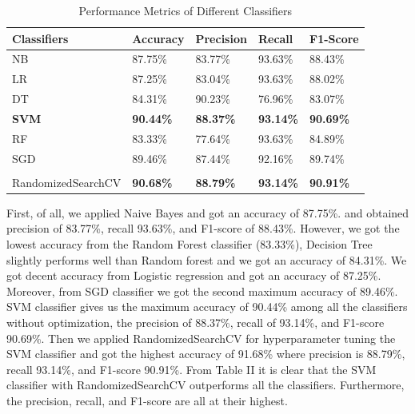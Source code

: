 \documentclass[conference]{IEEEtran}
\begin{document}
\begin{table}[h]
\caption{Performance Metrics of Different Classifiers}
\setlength{\tabcolsep}{5pt} %
\renewcommand{\arraystretch}{2.5} %
\begin{tabular}{|l|l|l|l|l|}
\hline
{\textbf{Classifiers}} & \textbf{Accuracy} & \textbf{Precision} & \textbf{Recall} & \textbf{F1-Score} \\ \hline
NB & 87.75\% & 83.77\% & 93.63\% & 88.43\% \\ \hline
LR & 87.25\% & 83.04\% & 93.63\% & 88.02\% \\ \hline
DT       & 84.31\% & 90.23\% & 76.96\% & 83.07\% \\ \hline
\textbf{{SVM}} & \textbf{{90.44\%}}  & \textbf{{88.37\% }} & \textbf{{93.14\%}} & \textbf{{ 90.69\%}} \\ \hline
RF    & 83.33\% & 77.64\% & 93.63\% & 84.89\% \\ \hline
SGD                 & 89.46\% & 87.44\% & 92.16\% & 89.74\% \\ \hline
\textbf{{\pbox{20cm}{SVM with \\ RandomizedSearchCV}}}                 & \textbf{{90.68\%}} & \textbf{{88.79\%}} & \textbf{{93.14\%}} & \textbf{{90.91\%}} \\ \hline
\end{tabular}
\end{table}

    First, of all, we applied Naive Bayes and got an accuracy of 87.75\%. and obtained precision of 83.77\%, recall 93.63\%, and F1-score of 88.43\%.  However, we got the lowest accuracy from the Random Forest classifier (83.33\%), Decision Tree slightly performs well than Random forest and we got an accuracy of 84.31\%. We got decent accuracy from Logistic regression and got an accuracy of 87.25\%. Moreover, from SGD classifier we got the second maximum accuracy of 89.46\%. SVM classifier gives us the maximum accuracy of 90.44\% among all the classifiers without optimization, the precision of 88.37\%, recall of 93.14\%, and F1-score 90.69\%. Then we applied RandomizedSearchCV for hyperparameter tuning the SVM classifier and got the highest accuracy of 91.68\% where precision is 88.79\%, recall 93.14\%, and F1-score 90.91\%. From Table II it is clear that the SVM classifier with RandomizedSearchCV outperforms all the classifiers. Furthermore, the precision, recall, and F1-score are all at their highest. 
    \\
   \hspace{1cm}
   
\end{document}
